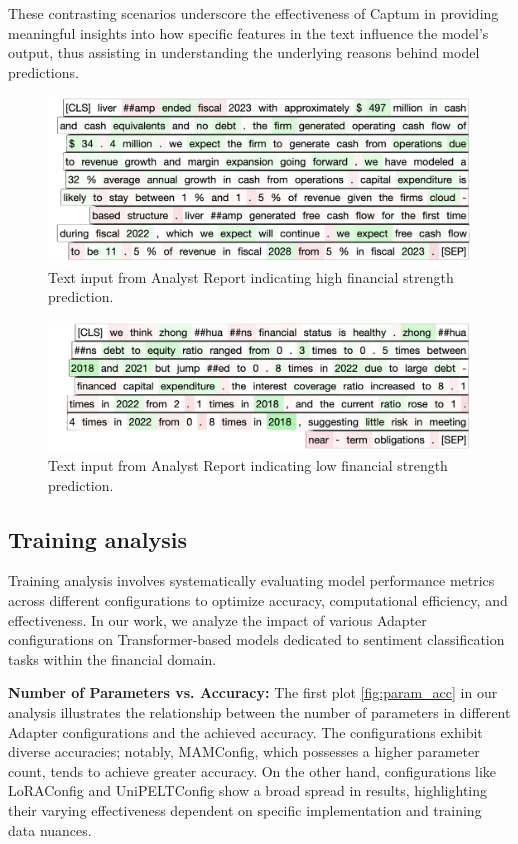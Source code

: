 \documentclass[conference]{IEEEtran}
\begin{document}
These contrasting scenarios underscore the effectiveness of Captum in providing meaningful insights into how specific features in the text influence the model's output, thus assisting in understanding the underlying reasons behind model predictions.


\begin{figure}[!h]
    \centering
    \includegraphics[width=.85\linewidth]{pictures/high_1.png}
    \caption{Text input from Analyst Report indicating high financial strength prediction.}
    \label{fig:high1}
\end{figure}

\begin{figure}[!h]
    \centering
    \includegraphics[width=.85\linewidth]{pictures/low_3.png}
    \caption{Text input from Analyst Report indicating low financial strength prediction.}
    \label{fig:low3}
\end{figure}



\subsection{Training analysis}%
Training analysis involves systematically evaluating model performance metrics across different configurations to optimize accuracy, computational efficiency, and effectiveness. In our work, we analyze the impact of various Adapter configurations on Transformer-based models dedicated to sentiment classification tasks within the financial domain.

\textbf{Number of Parameters vs. Accuracy:} The first plot \ref{fig:param_acc} in our analysis illustrates the relationship between the number of parameters in different Adapter configurations and the achieved accuracy. The configurations exhibit diverse accuracies; notably, MAMConfig, which possesses a higher parameter count, tends to achieve greater accuracy. On the other hand, configurations like LoRAConfig and UniPELTConfig show a broad spread in results, highlighting their varying effectiveness dependent on specific implementation and training data nuances.
\end{document}
